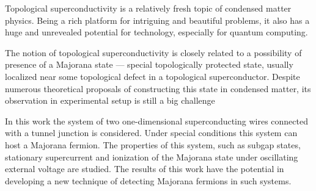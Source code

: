 Topological superconductivity is a relatively fresh topic of condensed matter physics. Being a rich platform for intriguing and beautiful problems, it also has a huge and unrevealed potential for technology, especially for quantum computing.

The notion of topological superconductivity is closely related to a possibility of presence of a Majorana state --- special topologically protected state, usually localized near some topological defect in a topological superconductor. Despite  numerous theoretical proposals of constructing this state in condensed matter, its observation in experimental setup is still a big challenge

In this work the system of two one-dimensional superconducting wires connected with a tunnel junction is considered. Under special conditions this system can host a Majorana fermion. The properties of this system, such as subgap states, stationary supercurrent and ionization of the Majorana state under  oscillating external voltage are studied. The results of this work have the potential in developing a new technique of detecting Majorana fermions in such systems.